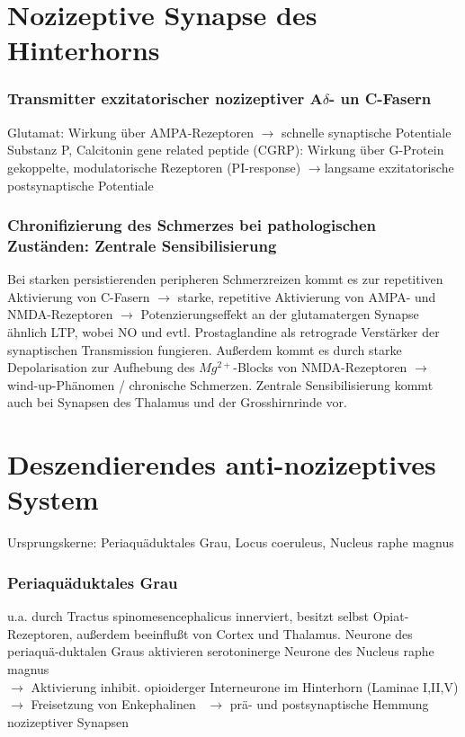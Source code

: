 \documentclass[10pt,a4paper]{report}
\begin{document}
\section{Nozizeptive Synapse des Hinterhorns} %
\label{sec:nozizeptive_synapse_des_hinterhorns}
\subsubsection{Transmitter exzitatorischer nozizeptiver A$\delta$- un C-Fasern} %
\label{par:transmitter_exzitatorischer_nozizeptiver_a_un_c_fasern}
Glutamat: Wirkung über AMPA-Rezeptoren $\rightarrow$ schnelle synaptische Potentiale\\
Substanz P, Calcitonin gene related peptide (CGRP): Wirkung über G-Protein gekoppelte, modulatorische Rezeptoren (PI-response) $\rightarrow$langsame exzitatorische postsynaptische Potentiale
\subsubsection{Chronifizierung des Schmerzes bei pathologischen Zuständen:
Zentrale Sensibilisierung } %
Bei starken persistierenden peripheren Schmerzreizen kommt es zur 
repetitiven Aktivierung von C-Fasern $\rightarrow$ starke, repetitive Aktivierung von AMPA- und NMDA-Rezeptoren $\rightarrow$ Potenzierungseffekt an der glutamatergen Synapse ähnlich LTP, wobei  NO  und evtl. Prostaglandine als retrograde Verstärker der synaptischen Transmission fungieren. Außerdem kommt es durch starke Depolarisation zur Aufhebung des $Mg^{2+}$-Blocks von NMDA-Rezeptoren $\rightarrow$ wind-up-Phänomen / chronische Schmerzen.
Zentrale Sensibilisierung kommt auch bei Synapsen des Thalamus und der Grosshirnrinde vor.
\section{Deszendierendes anti-nozizeptives System} %
\label{sec:deszendierendes_anti_nozizeptives_system}
Ursprungskerne: Periaquäduktales Grau, Locus coeruleus, Nucleus raphe magnus
\subsubsection{Periaquäduktales Grau} %
\label{par:periaqu_duktales_grau}
 u.a. durch Tractus spinomesencephalicus innerviert, besitzt selbst Opiat-Rezeptoren, außerdem beeinflußt von Cortex und Thalamus. Neurone des periaquä-duktalen Graus aktivieren 
serotoninerge Neurone des Nucleus raphe magnus \\
$\rightarrow$ Aktivierung inhibit. opioiderger Interneurone im Hinterhorn (Laminae I,II,V) \\
$\rightarrow$ Freisetzung von Enkephalinen \
$\rightarrow$ prä- und postsynaptische Hemmung nozizeptiver 
Synapsen \\
\end{document}

